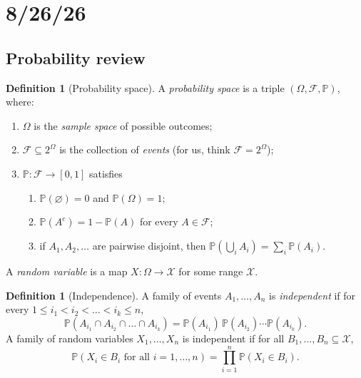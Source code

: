 \documentclass[11pt]{article}
\theoremstyle{definition}
\newtheorem{definition}[theorem]{Definition}
\theoremstyle{remark}
\newcommand{\PP}{\mathbb{P}}
\newcommand{\X}{\mathcal{X}}
\newcommand{\F}{\mathcal{F}}
\begin{document}
\section{8/26/26}

\subsection{Probability review}

\begin{definition}[Probability space]
A \emph{probability space} is a triple \((\Omega, \F, \PP)\), where:
\begin{enumerate}
    \item \(\Omega\) is the \emph{sample space} of possible outcomes;

    \item \(\F \subseteq 2^{\Omega}\) is the collection of \emph{events} (for us, think \(\F = 2^{\Omega}\));

    \item \(\PP: \F \to [0,1]\) satisfies
    \begin{enumerate}
        \item \(\PP(\varnothing) = 0\) and \(\PP(\Omega) = 1\);

        \item \(\PP(A^c) = 1 - \PP(A)\) for every \(A \in \F\);

        \item if \(A_1, A_2, \dots\) are pairwise disjoint, then
        \(\PP\!\left(\bigcup_{i} A_i\right) = \sum_i \PP(A_i)\).
    \end{enumerate}
\end{enumerate}
\end{definition}

A \emph{random variable} is a map \(X : \Omega \to \X\) for some range \(\X\).

\begin{definition}[Independence]
A family of events \(A_1, \dots, A_n\) is \emph{independent} if for every
\(1 \le i_1 < i_2 < \dots < i_k \le n\),
\begin{equation*}
    \PP\!\left(A_{i_1} \cap A_{i_2} \cap \dots \cap A_{i_k}\right)
    = \PP(A_{i_1})\,\PP(A_{i_2}) \cdots \PP(A_{i_k}).
\end{equation*}
A family of random variables \(X_1, \dots, X_n\) is independent if for all
\(B_1, \dots, B_n \subseteq \X\),
\begin{equation*}
    \PP\!\left(X_i \in B_i \text{ for all } i = 1, \dots, n\right)
    = \prod_{i=1}^{n} \PP(X_i \in B_i).
\end{equation*}
\end{definition}
\end{document}
